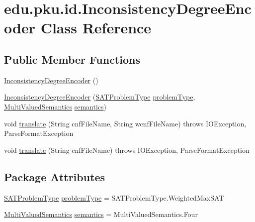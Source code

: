 \hypertarget{classedu_1_1pku_1_1id_1_1_inconsistency_degree_encoder}{
\section{edu.pku.id.InconsistencyDegreeEncoder Class Reference}
\label{classedu_1_1pku_1_1id_1_1_inconsistency_degree_encoder}
}
\subsection*{Public Member Functions}
\begin{DoxyCompactItemize}
\item 
\hyperlink{classedu_1_1pku_1_1id_1_1_inconsistency_degree_encoder_a64dfbb6aed0d956064d2c1419f293d03}{InconsistencyDegreeEncoder} ()
\item 
\hyperlink{classedu_1_1pku_1_1id_1_1_inconsistency_degree_encoder_a9e14e7f2ff6fc39e35bb416aacee80dd}{InconsistencyDegreeEncoder} (\hyperlink{namespaceedu_1_1pku_1_1id_a7936f4efdc70b70b965d63bd005a2513}{SATProblemType} \hyperlink{classedu_1_1pku_1_1id_1_1_inconsistency_degree_encoder_aee8f96c039d4721b6a5255fc74a09be2}{problemType}, \hyperlink{namespaceedu_1_1pku_1_1id_ad71ddcb0be4b31cdeeb2a5d755309f2d}{MultiValuedSemantics} \hyperlink{classedu_1_1pku_1_1id_1_1_inconsistency_degree_encoder_a1d0f9f05b809b927a038874d1f879fb7}{semantics})
\item 
void \hyperlink{classedu_1_1pku_1_1id_1_1_inconsistency_degree_encoder_a0798891ae616847ba9071ee173ae97d3}{translate} (String cnfFileName, String wcnfFileName)  throws IOException, ParseFormatException 
\item 
void \hyperlink{classedu_1_1pku_1_1id_1_1_inconsistency_degree_encoder_ad7cee1fe49fb6119f859d14beec1635c}{translate} (String cnfFileName)  throws IOException, 			ParseFormatException 
\end{DoxyCompactItemize}
\subsection*{Package Attributes}
\begin{DoxyCompactItemize}
\item 
\hyperlink{namespaceedu_1_1pku_1_1id_a7936f4efdc70b70b965d63bd005a2513}{SATProblemType} \hyperlink{classedu_1_1pku_1_1id_1_1_inconsistency_degree_encoder_aee8f96c039d4721b6a5255fc74a09be2}{problemType} = SATProblemType.WeightedMaxSAT
\item 
\hyperlink{namespaceedu_1_1pku_1_1id_ad71ddcb0be4b31cdeeb2a5d755309f2d}{MultiValuedSemantics} \hyperlink{classedu_1_1pku_1_1id_1_1_inconsistency_degree_encoder_a1d0f9f05b809b927a038874d1f879fb7}{semantics} = MultiValuedSemantics.Four
\end{DoxyCompactItemize}


